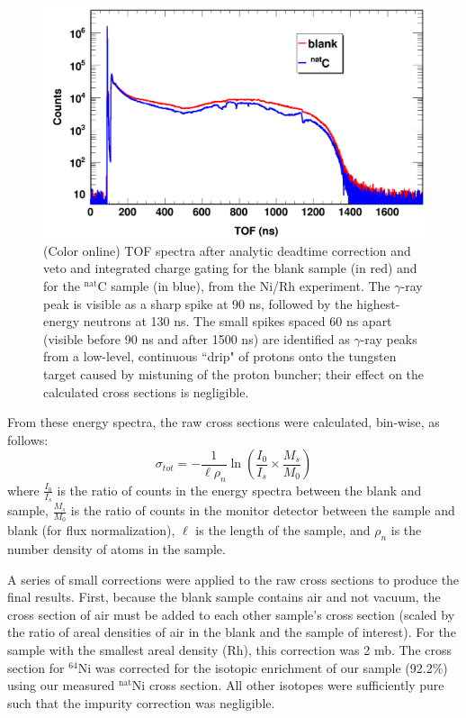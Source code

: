 \documentclass[twocolumn,secnumarabic,amssymb, nobibnotes, aps, prl,
superscriptaddress, nobalancelastpage]{revtex4}
\newcommand{\tot}{\ensuremath{\sigma_{tot}}}
\begin{document}
\begin{figure}
    \includegraphics[scale=0.3]{figures/exampleTOFSpectrum.png}
    \caption{(Color online) TOF spectra after analytic deadtime correction and
        veto and integrated charge gating for the blank sample (in
        red) and for the $^{\text{nat}}$C sample (in blue), from the Ni/Rh experiment.
        The $\gamma$-ray peak is visible as a sharp spike at 90 ns, followed by
        the highest-energy neutrons at 130 ns. The small spikes spaced 60 ns
        apart (visible before 90 ns and after 1500
        ns) are identified as $\gamma$-ray peaks from a low-level, continuous ``drip" 
        of protons onto the tungsten target caused by mistuning of the proton 
        buncher; their effect on the calculated cross sections is negligible.
    }
    \label{ExampleTOFSpectrum}
\end{figure}

From these energy spectra, the raw cross sections were calculated, bin-wise, as follows:
$$
\tot = -\frac{1}{\ell\rho_{n}}
\ln \left(\frac{I_{0}}{I_{s}}\times\frac{M_{s}}{M_{0}}\right)
$$
where $\frac{I_{0}}{I_{s}}$ is the ratio of counts in the energy spectra between 
the blank and sample, $\frac{M_{s}}{M_{0}}$ is the ratio of counts in the
monitor detector between the sample and blank (for flux normalization), $\ell$ is the length 
of the sample, and $\rho_{n}$ is the number density of atoms in the sample.

A series of small corrections were applied to the raw cross sections to produce
the final results. First, because the blank sample contains air and not vacuum,
the cross section of air must be added to each other sample's cross section (scaled by  
the ratio of areal densities of air in the blank and the sample of interest).
For the sample with the smallest areal density (Rh), this correction was 2 mb.
The cross section for $^{64}$Ni was corrected for the isotopic enrichment of our
sample (92.2\%) using our measured $^{\text{nat}}$Ni cross section. All other isotopes were 
sufficiently pure such that the impurity correction was negligible.
\end{document}

